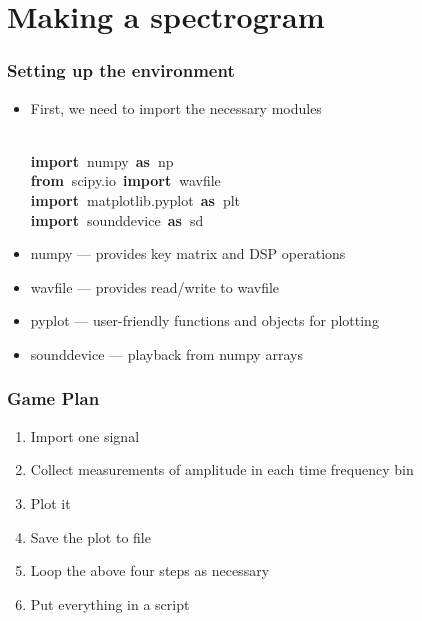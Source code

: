 \documentclass{beamer}\usepackage[]{graphicx}\usepackage[]{color}
\makeatletter
\newcommand{\hlopt}[1]{\textcolor[rgb]{0,0,0}{#1}}%
\newcommand{\hlstd}[1]{\textcolor[rgb]{0.345,0.345,0.345}{#1}}%
\newcommand{\hlkwa}[1]{\textcolor[rgb]{0.161,0.373,0.58}{\textbf{#1}}}%
\newenvironment{kframe}{%
 \def\at@end@of@kframe{}%
 \ifinner\ifhmode%
  \def\at@end@of@kframe{\end{minipage}}%
  \begin{minipage}{\columnwidth}%
 \fi\fi%
 \def\FrameCommand##1{\hskip\@totalleftmargin \hskip-\fboxsep
 \colorbox{shadecolor}{##1}\hskip-\fboxsep
     \hskip-\linewidth \hskip-\@totalleftmargin \hskip\columnwidth}%
 \MakeFramed {\advance\hsize-\width
   \@totalleftmargin\z@ \linewidth\hsize
   \@setminipage}}%
 {\par\unskip\endMakeFramed%
 \at@end@of@kframe}
\newenvironment{knitrout}{}{} %
\makeatother
\begin{document}
\section{Making a spectrogram}
\begin{frame}[fragile]
\frametitle{Setting up the environment}
\begin{itemize}
	\item First, we need to import the necessary modules
\begin{knitrout}
\color{fgcolor}\begin{kframe}
\noindent
\ttfamily
\hlstd{}\hspace*{\fill}\\
\hlkwa{import\ }\hlstd{numpy\ }\hlkwa{as\ }\hlstd{np}\hspace*{\fill}\\
\hlkwa{from\ }\hlstd{scipy}\hlopt{.}\hlstd{io\ }\hlkwa{import\ }\hlstd{wavfile}\hspace*{\fill}\\
\hlkwa{import\ }\hlstd{matplotlib}\hlopt{.}\hlstd{pyplot\ }\hlkwa{as\ }\hlstd{plt}\hspace*{\fill}\\
\hlkwa{import\ }\hlstd{sounddevice\ }\hlkwa{as\ }\hlstd{sd}\hspace*{\fill}\\
\hspace*{\fill}
\mbox{}
\normalfont
\end{kframe}
\end{knitrout}
\end{itemize}

\begin{itemize}
	\item numpy --- provides key matrix and DSP operations

	\item wavfile --- provides read/write to wavfile
	
	\item pyplot --- user-friendly functions and objects for plotting

	\item sounddevice --- playback from numpy arrays
\end{itemize}
\end{frame}

\begin{frame}[fragile]
\frametitle{Game Plan}
\begin{enumerate}
		\item Import one signal

		\item Collect measurements of amplitude in each time frequency bin 

		\item Plot it

		\item Save the plot to file

		\item Loop the above four steps as necessary

		\item Put everything in a script
\end{enumerate}
\end{frame}
\end{document}

